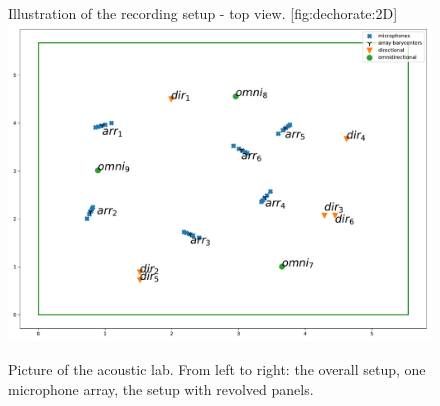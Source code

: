 \begin{figure}[b]
    \begin{sidecaption}[]{
        Illustration of the recording setup - top view.
        }[fig:dechorate:2D]
        \centering
        \includegraphics[width=0.8\linewidth]{figures/dechorate/positioning2D_xy.pdf}
    \end{sidecaption}
\end{figure}

\begin{figure}[t]
    \begin{fullwidth}
    \centering
    \label{fig:dechorate:setup}
    \caption{Picture of the acoustic lab. From left to right: the overall setup, one microphone array, the setup with revolved panels.}
    \end{fullwidth}
\end{figure}

